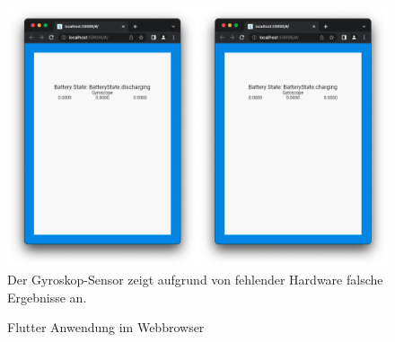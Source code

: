 \documentclass[a4paper]{scrartcl}
\begin{document}
\begin{figure}[H]
	\centering
	\caption{Flutter Anwendung im Webbrowser}
	\includegraphics[scale=0.25]{_assets/WebApp_Flutter.png} \\
	Der Gyroskop-Sensor zeigt aufgrund von fehlender Hardware falsche Ergebnisse an.
\end{figure}
\end{document}
